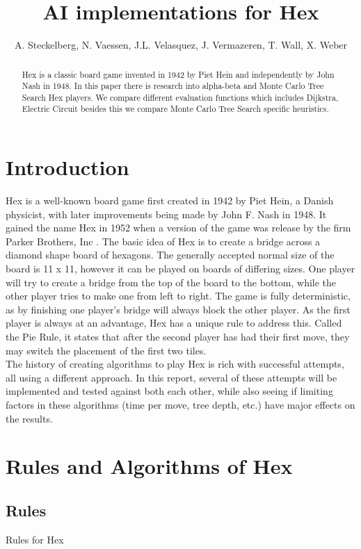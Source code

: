 \documentclass{ba-kecs}
\title{AI implementations for Hex}
\author{A. Steckelberg, N. Vaessen, J.L. Velasquez, J. Vermazeren, T. Wall, X. Weber}
\begin{document}
\maketitle

\begin{abstract}
 Hex is a classic board game invented in 1942 by Piet Hein and independently by John Nash in 1948. In this paper there is research into alpha-beta  and Monte Carlo Tree Search Hex players. We compare different evaluation functions which includes Dijkstra, Electric Circuit besides this we compare Monte Carlo Tree Search specific heuristics.   
\end{abstract}

\section{Introduction}
Hex is a well-known board game first created in 1942 by Piet Hein, a Danish physicist, with later improvements being made by John F. Nash in 1948. It gained the name Hex in 1952 when a version of the game was release by the firm Parker Brothers, Inc \cite{gardener1959hex}. The basic idea of Hex is to create a bridge across a diamond shape board of hexagons. The generally accepted normal size of the board is 11 x 11, however it can be played on boards of differing sizes. One player will try to create a bridge from the top of the board to the bottom, while the other player tries to make one from left to right. The game is fully deterministic, as by finishing one player’s bridge will always block the other player. As the first player is always at an advantage, Hex has a unique rule to address this. Called the Pie Rule, it states that after the second player has had their first move, they may switch the placement of the first two tiles.\\
The history of creating algorithms to play Hex is rich with successful attempts, all using a different approach. In this report, several of these attempts will be implemented and tested against both each other, while also seeing if limiting factors in these algorithms (time per move, tree depth, etc.) have major effects on the results.



\section{Rules and Algorithms of Hex}
\subsection{Rules}
Rules for Hex
\end{document}
